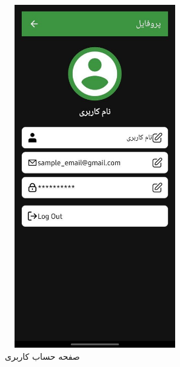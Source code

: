 \documentclass{report}
\begin{document}
 
  \begin{figure}[ht]
 	\centering
 	\includegraphics[width=0.7\textwidth,height=15cm,keepaspectratio]{Pic/profile}
 	\caption{صفحه حساب کاربری}
 	\label{fig:profile}
 \end{figure}
\end{document}

